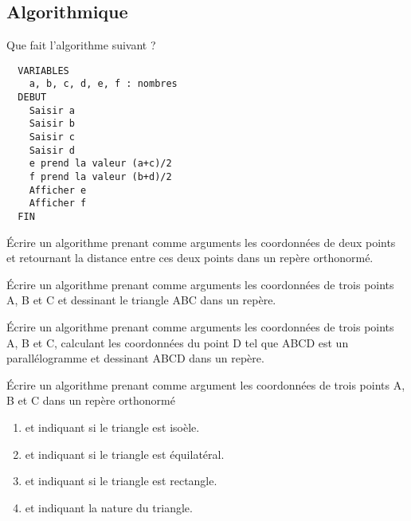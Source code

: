 \begin{multicols}{2}
\subsection{Algorithmique}
\begin{exo}
 Que fait l'algorithme suivant ?
\begin{algo}
 \begin{verbatim}
  VARIABLES
    a, b, c, d, e, f : nombres
  DEBUT
    Saisir a
    Saisir b
    Saisir c
    Saisir d
    e prend la valeur (a+c)/2
    f prend la valeur (b+d)/2
    Afficher e
    Afficher f
  FIN
 \end{verbatim}

\end{algo}

\end{exo}

\begin{exo}
 \'Ecrire un algorithme prenant comme arguments les coordonn\'ees de deux points et retournant la distance entre ces deux points dans un rep\`ere orthonorm\'e.
\end{exo}


\begin{exo}
\'Ecrire un algorithme prenant comme arguments les coordonnées de trois points A, B et C et dessinant le triangle ABC dans un repère.
\end{exo}

\begin{exo}
\'Ecrire un algorithme prenant comme arguments les coordonnées de trois points A, B et C, calculant  les coordonnées du point D tel que ABCD est un parallélogramme et dessinant ABCD dans un repère.
\end{exo}

\begin{exo}
\'Ecrire un algorithme prenant comme argument les coordonnées de trois points A, B et C dans un rep\`ere orthonorm\'e
\begin{enumerate}
\item et indiquant si le triangle est iso\`ele.
\item et indiquant si le triangle est \'equilat\'eral.
\item et indiquant si le triangle est rectangle.
\item et indiquant la nature du triangle.
\end{enumerate}
\end{exo}

\end{multicols}




